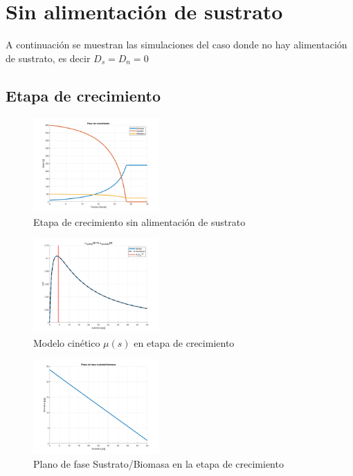 \documentclass[letterpaper, 10 pt, conference]{ieeeconf}  %
\begin{document}
\section{Sin alimentación de sustrato}

A continuación se muestran las simulaciones del caso donde no hay alimentación de sustrato, es decir $D_{s}=D_{n}=0$

\subsection{Etapa de crecimiento}

\begin{figure}[H]
  \centering
  \includegraphics[width=0.43\textwidth]{./Images_tp1/D0_crecimiento_completo.png}
  \caption{Etapa de crecimiento sin alimentación de sustrato}
  \label{fig:D0_whole}
\end{figure}

\begin{figure}[H]
  \centering
  \includegraphics[width=0.43\textwidth]{./Images_tp1/D0_mus.png}
  \caption{Modelo cinético $\mu(s)$ en etapa de crecimiento}
  \label{fig:D0_mu}
\end{figure}

\begin{figure}[H]
  \centering
  \includegraphics[width=0.43\textwidth]{./Images_tp1/D0_plano_fase.png}
  \caption{Plano de fase Sustrato/Biomasa en la etapa de crecimiento}
  \label{fig:D0_fase}
\end{figure}
\end{document}
